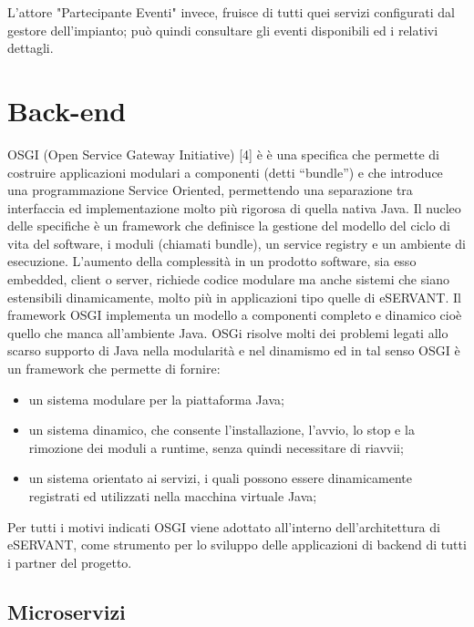 L'attore "Partecipante Eventi" invece, fruisce di tutti quei servizi configurati dal gestore dell'impianto; può quindi consultare gli eventi disponibili ed
i relativi dettagli.

\section{Back-end}
OSGI (Open Service Gateway Initiative) [4] è  è una specifica che permette di costruire
applicazioni modulari a componenti (detti “bundle”) e che introduce una
programmazione Service Oriented, permettendo una separazione tra interfaccia ed
implementazione molto più rigorosa di quella nativa Java.
Il nucleo delle specifiche è un framework che definisce la gestione del modello del ciclo di vita del software, i moduli (chiamati bundle), un service registry e un ambiente di esecuzione. 
L’aumento della complessità in un prodotto software, sia esso embedded, client o server, richiede codice modulare ma anche sistemi che siano estensibili dinamicamente, molto più in applicazioni tipo quelle di eSERVANT. Il framework OSGI implementa un modello a componenti completo e dinamico cioè quello che manca all’ambiente Java. 
OSGi risolve molti dei problemi legati allo scarso supporto di Java nella modularità e nel dinamismo ed in tal senso OSGI è un framework che permette di fornire: 
\begin{itemize}
\item un sistema modulare per la piattaforma Java;
\item un sistema dinamico, che consente l’installazione, l’avvio, lo stop e la
rimozione dei moduli a runtime, senza quindi necessitare di riavvii;
\item un sistema orientato ai servizi, i quali possono essere dinamicamente
registrati ed utilizzati nella macchina virtuale Java;
\end{itemize}




Per tutti i motivi indicati OSGI viene adottato all’interno dell’architettura di eSERVANT,
come strumento per lo sviluppo delle applicazioni di backend di tutti i partner del
progetto.

\subsection{Microservizi}

